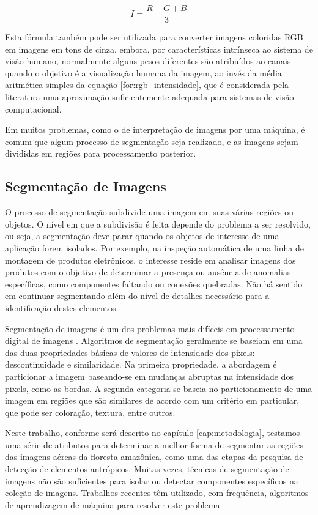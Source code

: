 \begin{equation}
	\displaystyle I = \frac{R + G + B}{3}
	\label{for:rgb_intensidade}
\end{equation}

Esta fórmula também pode ser utilizada para converter imagens coloridas RGB em imagens em tons de cinza, embora, por características intrínseca ao sistema de visão humano, normalmente alguns pesos diferentes são atribuídos ao canais quando o objetivo é a visualização humana da imagem, ao invés da média aritmética simples da equação \ref{for:rgb_intensidade}, que é considerada pela literatura uma aproximação suficientemente adequada para sistemas de visão computacional.


Em muitos problemas, como o de interpretação de imagens por uma máquina, é comum que algum processo de segmentação seja realizado, e as imagens sejam divididas em regiões para processamento posterior.


\subsection{Segmentação de Imagens}

O processo de segmentação subdivide uma imagem em suas várias regiões ou objetos. O nível em que a subdivisão é feita depende do problema a ser resolvido, ou seja, a segmentação deve parar quando os objetos de interesse de uma aplicação forem isolados. Por exemplo, na inspeção automática de uma linha de montagem de produtos eletrônicos, o interesse reside em analisar imagens dos produtos com o objetivo de determinar a presença ou ausência de anomalias específicas, como componentes faltando ou conexões quebradas. Não há sentido em continuar segmentando além do nível de detalhes necessário para a identificação destes elementos.

Segmentação de imagens é um dos problemas mais difíceis em processamento digital de imagens \cite{gonzalez:2002}. Algoritmos de segmentação geralmente se baseiam em uma das duas propriedades básicas de valores de intensidade dos pixels: descontinuidade e similaridade. Na primeira propriedade, a abordagem é particionar a imagem baseando-se em mudanças abruptas na intensidade dos pixels, como as bordas. A segunda categoria se baseia no particionamento de uma imagem em regiões que são similares de acordo com um critério em particular, que pode ser coloração, textura, entre outros.

Neste trabalho, conforme será descrito no capítulo \ref{cap:metodologia}, testamos uma série de atributos para determinar a melhor forma de segmentar as regiões das imagens aéreas da floresta amazônica, como uma das etapas da pesquisa de detecção de elementos antrópicos. Muitas vezes, técnicas de segmentação de imagens não são suficientes para isolar ou detectar componentes específicos na coleção de imagens. Trabalhos recentes têm utilizado, com frequência, algoritmos de aprendizagem de máquina para resolver este problema.


